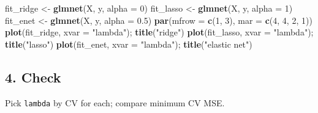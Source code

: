 \documentclass[
]{article}
\newenvironment{Shaded}{\begin{snugshade}}{\end{snugshade}}
\newcommand{\AttributeTok}[1]{\textcolor[rgb]{0.13,0.29,0.53}{#1}}
\newcommand{\DecValTok}[1]{\textcolor[rgb]{0.00,0.00,0.81}{#1}}
\newcommand{\FloatTok}[1]{\textcolor[rgb]{0.00,0.00,0.81}{#1}}
\newcommand{\FunctionTok}[1]{\textcolor[rgb]{0.13,0.29,0.53}{\textbf{#1}}}
\newcommand{\NormalTok}[1]{#1}
\newcommand{\OtherTok}[1]{\textcolor[rgb]{0.56,0.35,0.01}{#1}}
\newcommand{\StringTok}[1]{\textcolor[rgb]{0.31,0.60,0.02}{#1}}
\begin{document}
\begin{Shaded}
\begin{Highlighting}[]
\NormalTok{fit\_ridge }\OtherTok{\textless{}{-}} \FunctionTok{glmnet}\NormalTok{(X, y, }\AttributeTok{alpha =} \DecValTok{0}\NormalTok{)}
\NormalTok{fit\_lasso }\OtherTok{\textless{}{-}} \FunctionTok{glmnet}\NormalTok{(X, y, }\AttributeTok{alpha =} \DecValTok{1}\NormalTok{)}
\NormalTok{fit\_enet  }\OtherTok{\textless{}{-}} \FunctionTok{glmnet}\NormalTok{(X, y, }\AttributeTok{alpha =} \FloatTok{0.5}\NormalTok{)}
\FunctionTok{par}\NormalTok{(}\AttributeTok{mfrow =} \FunctionTok{c}\NormalTok{(}\DecValTok{1}\NormalTok{, }\DecValTok{3}\NormalTok{), }\AttributeTok{mar =} \FunctionTok{c}\NormalTok{(}\DecValTok{4}\NormalTok{, }\DecValTok{4}\NormalTok{, }\DecValTok{2}\NormalTok{, }\DecValTok{1}\NormalTok{))}
\FunctionTok{plot}\NormalTok{(fit\_ridge, }\AttributeTok{xvar =} \StringTok{"lambda"}\NormalTok{); }\FunctionTok{title}\NormalTok{(}\StringTok{"ridge"}\NormalTok{)}
\FunctionTok{plot}\NormalTok{(fit\_lasso, }\AttributeTok{xvar =} \StringTok{"lambda"}\NormalTok{); }\FunctionTok{title}\NormalTok{(}\StringTok{"lasso"}\NormalTok{)}
\FunctionTok{plot}\NormalTok{(fit\_enet,  }\AttributeTok{xvar =} \StringTok{"lambda"}\NormalTok{); }\FunctionTok{title}\NormalTok{(}\StringTok{"elastic net"}\NormalTok{)}
\end{Highlighting}
\end{Shaded}

\subsection{4. Check}\label{check}

Pick \texttt{lambda} by CV for each; compare minimum CV MSE.
\end{document}
